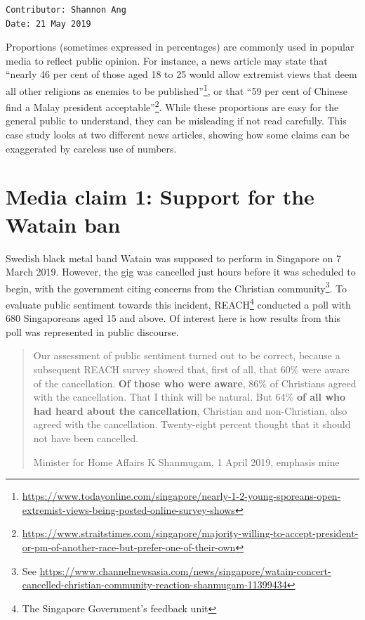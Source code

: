\documentclass[openany]{book}
\let\rmarkdownfootnote\footnote%
\def\footnote{\protect\rmarkdownfootnote}
\begin{document}
\begin{verbatim}
Contributor: Shannon Ang
Date: 21 May 2019
\end{verbatim}

Proportions (sometimes expressed in percentages) are commonly used in
popular media to reflect public opinion. For instance, a news article
may state that ``nearly 46 per cent of those aged 18 to 25 would allow
extremist views that deem all other religions as enemies to be
published''\footnote{\url{https://www.todayonline.com/singapore/nearly-1-2-young-sporeans-open-extremist-views-being-posted-online-survey-shows}},
or that ``59 per cent of Chinese find a Malay president
acceptable''\footnote{\url{https://www.straitstimes.com/singapore/majority-willing-to-accept-president-or-pm-of-another-race-but-prefer-one-of-their-own}}.
While these proportions are easy for the general public to understand,
they can be misleading if not read carefully. This case study looks at
two different news articles, showing how some claims can be exaggerated
by careless use of numbers.

\section{Media claim 1: Support for the Watain ban}\label{watain}

Swedish black metal band Watain was supposed to perform in Singapore on
7 March 2019. However, the gig was cancelled just hours before it was
scheduled to begin, with the government citing concerns from the
Christian community\footnote{See
  \url{https://www.channelnewsasia.com/news/singapore/watain-concert-cancelled-christian-community-reaction-shanmugam-11399434}}.
To evaluate public sentiment towards this incident, REACH\footnote{The
  Singapore Government's feedback unit} conducted a poll with 680
Singaporeans aged 15 and above. Of interest here is how results from
this poll was represented in public discourse.

\begin{quote}
Our assessment of public sentiment turned out to be correct, because a
subsequent REACH survey showed that, first of all, that 60\% were aware
of the cancellation. \textbf{Of those who were aware}, 86\% of
Christians agreed with the cancellation. That I think will be natural.
But 64\% \textbf{of all who had heard about the cancellation}, Christian
and non-Christian, also agreed with the cancellation. Twenty-eight
percent thought that it should not have been cancelled.

Minister for Home Affairs K Shanmugam, 1 April 2019, emphasis mine
\end{quote}
\end{document}
